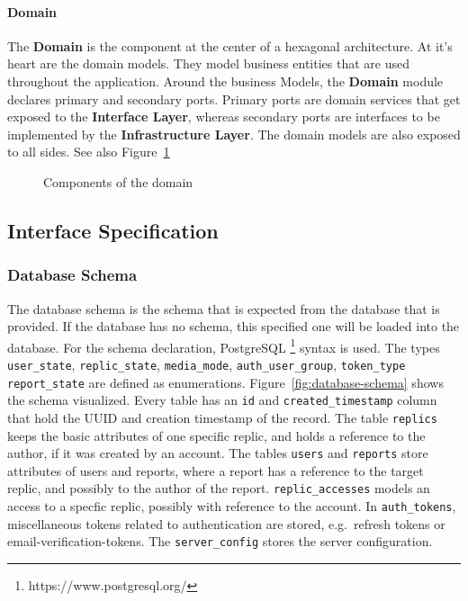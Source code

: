 \paragraph{Domain}\label{par:domain}
The \textbf{Domain} is the component at the center of a hexagonal architecture.
At it's heart are the domain models.
They model business entities that are used throughout the application. \newline
Around the business Models, the \textbf{Domain} module declares primary and secondary ports.
Primary ports are domain services that get exposed to the \textbf{Interface Layer}, whereas secondary ports are interfaces to be implemented by the \textbf{Infrastructure Layer}.
The domain models are also exposed to all sides.
See also Figure~\ref{fig:component-domain}

\begin{figure}
    \centering
    \caption{Components of the domain}
    \label{fig:component-domain}
\end{figure}

\subsection{Interface Specification}\label{subsec:interface-specification}

\subsubsection{Database Schema}
The database schema is the schema that is expected from the database that is provided.
If the database has no schema, this specified one will be loaded into the database. \newline
For the schema declaration, PostgreSQL \footnote{https://www.postgresql.org/} syntax is used.
The types \texttt{user\_state}, \texttt{replic\_state}, \texttt{media\_mode}, \texttt{auth\_user\_group}, \texttt{token\_type} \texttt{report\_state} are defined as enumerations. \newline
Figure~\ref{fig:database-schema} shows the schema visualized.
Every table has an \texttt{id} and \texttt{created\_timestamp} column that hold the UUID and creation timestamp of the record. \newline
The table \texttt{replics} keeps the basic attributes of one specific replic, and holds a reference to the author, if it was created by an account.
The tables \texttt{users} and \texttt{reports} store attributes of users and reports, where a report has a reference to the target replic, and possibly to the author of the report.
\texttt{replic\_accesses} models an access to a specfic replic, possibly with reference to the account.
In \texttt{auth\_tokens}, miscellaneous tokens related to authentication are stored, e.g.\ refresh tokens or email-verification-tokens.
The \texttt{server\_config} stores the server configuration.

